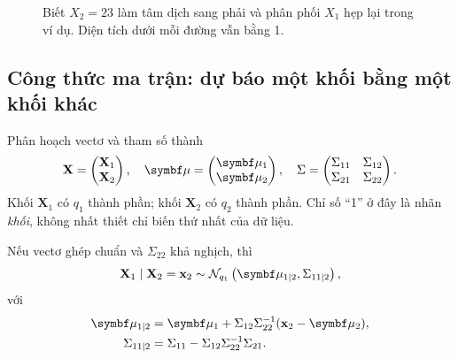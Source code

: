 \begin{figure}[htbp]
\centering
{}
\caption{Biết $X_2=23$ làm tâm dịch sang phải và phân phối $X_1$ hẹp lại
trong ví dụ. Diện tích dưới mỗi đường vẫn bằng 1.}
\end{figure}

\subsection{Công thức ma trận: dự báo một khối bằng một khối khác}
Phân hoạch vectơ và tham số thành
\[
 \mathbf X=\begin{pmatrix}\mathbf X_1\\\mathbf X_2\end{pmatrix},\quad
 \vmu=\begin{pmatrix}\vmu_1\\\vmu_2\end{pmatrix},\quad
 \Sigma=\begin{pmatrix}\Sigma_{11}&\Sigma_{12}\\\Sigma_{21}&\Sigma_{22}\end{pmatrix}.
\]
Khối $\mathbf X_1$ có $q_1$ thành phần; khối $\mathbf X_2$ có $q_2$ thành
phần. Chỉ số ``1'' ở đây là nhãn \emph{khối}, không nhất thiết chỉ biến
thứ nhất của dữ liệu.

\begin{result}
Nếu vectơ ghép chuẩn và $\Sigma_{22}$ khả nghịch, thì
\begin{equation}
 \mathbf X_1\mid\mathbf X_2=\mathbf x_2
 \sim\N_{q_1}\left(\vmu_{1\mid2},\Sigma_{11\mid2}\right),
 \label{eq:conditional}
\end{equation}
với
\begin{align}
 \vmu_{1\mid2}&=\vmu_1+\Sigma_{12}\Sigma_{22}^{-1}(\mathbf x_2-\vmu_2),
 \label{eq:conditionalmean}\\
 \Sigma_{11\mid2}&=\Sigma_{11}-\Sigma_{12}\Sigma_{22}^{-1}\Sigma_{21}.
 \label{eq:conditionalcov}
\end{align}
\end{result}

